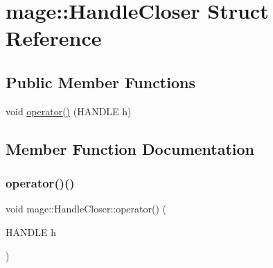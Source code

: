 \hypertarget{structmage_1_1_handle_closer}{}\section{mage\+:\+:Handle\+Closer Struct Reference}
\label{structmage_1_1_handle_closer}
\subsection*{Public Member Functions}
\begin{DoxyCompactItemize}
\item 
void \hyperlink{structmage_1_1_handle_closer_a0ac3cfb66b79de69791e5cfb936c6b1e}{operator()} (H\+A\+N\+D\+LE h)
\end{DoxyCompactItemize}


\subsection{Member Function Documentation}
\hypertarget{structmage_1_1_handle_closer_a0ac3cfb66b79de69791e5cfb936c6b1e}{}\label{structmage_1_1_handle_closer_a0ac3cfb66b79de69791e5cfb936c6b1e} 
\subsubsection{\texorpdfstring{operator()()}{operator()()}}
{\footnotesize\ttfamily void mage\+::\+Handle\+Closer\+::operator() (\begin{DoxyParamCaption}\item[{H\+A\+N\+D\+LE}]{h }\end{DoxyParamCaption})}

